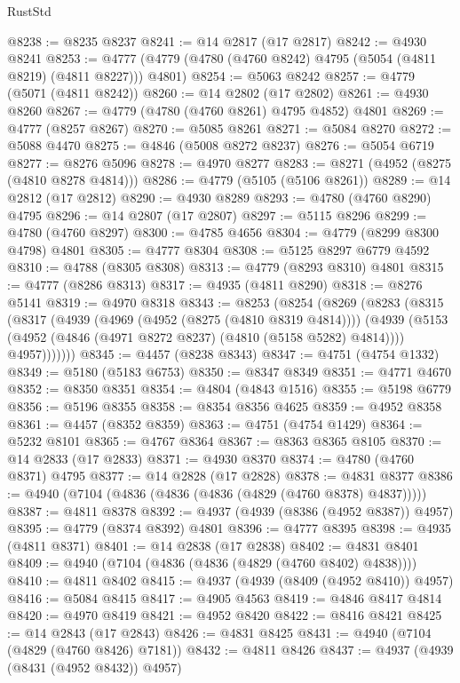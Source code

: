 \begin{lexlean}{RustStd}
\begin{coremodule}
@8238 := @8235 @8237
@8241 := @14 @2817 (@17 @2817)
@8242 := @4930 @8241
@8253 := @4777 (@4779 (@4780 (@4760 @8242) @4795 (@5054 (@4811 @8219) (@4811 @8227))) @4801)
@8254 := @5063 @8242
@8257 := @4779 (@5071 (@4811 @8242))
@8260 := @14 @2802 (@17 @2802)
@8261 := @4930 @8260
@8267 := @4779 (@4780 (@4760 @8261) @4795 @4852) @4801
@8269 := @4777 (@8257 @8267)
@8270 := @5085 @8261
@8271 := @5084 @8270
@8272 := @5088 @4470
@8275 := @4846 (@5008 @8272 @8237)
@8276 := @5054 @6719
@8277 := @8276 @5096
@8278 := @4970 @8277
@8283 := @8271 (@4952 (@8275 (@4810 @8278 @4814)))
@8286 := @4779 (@5105 (@5106 @8261))
@8289 := @14 @2812 (@17 @2812)
@8290 := @4930 @8289
@8293 := @4780 (@4760 @8290) @4795
@8296 := @14 @2807 (@17 @2807)
@8297 := @5115 @8296
@8299 := @4780 (@4760 @8297)
@8300 := @4785 @4656
@8304 := @4779 (@8299 @8300 @4798) @4801
@8305 := @4777 @8304
@8308 := @5125 @8297 @6779 @4592
@8310 := @4788 (@8305 @8308)
@8313 := @4779 (@8293 @8310) @4801
@8315 := @4777 (@8286 @8313)
@8317 := @4935 (@4811 @8290)
@8318 := @8276 @5141
@8319 := @4970 @8318
@8343 := @8253
    (@8254
      (@8269
        (@8283
          (@8315
            (@8317
              (@4939
                (@4969 (@4952 (@8275 (@4810 @8319 @4814))))
                (@4939
                  (@5153 (@4952 (@4846 (@4971 @8272 @8237) (@4810 (@5158 @5282) @4814))))
                  @4957)))))))
@8345 := @4457 (@8238 @8343)
@8347 := @4751 (@4754 @1332)
@8349 := @5180 (@5183 @6753)
@8350 := @8347 @8349
@8351 := @4771 @4670
@8352 := @8350 @8351
@8354 := @4804 (@4843 @1516)
@8355 := @5198 @6779
@8356 := @5196 @8355
@8358 := @8354 @8356 @4625
@8359 := @4952 @8358
@8361 := @4457 (@8352 @8359)
@8363 := @4751 (@4754 @1429)
@8364 := @5232 @8101
@8365 := @4767 @8364
@8367 := @8363 @8365 @8105
@8370 := @14 @2833 (@17 @2833)
@8371 := @4930 @8370
@8374 := @4780 (@4760 @8371) @4795
@8377 := @14 @2828 (@17 @2828)
@8378 := @4831 @8377
@8386 := @4940 (@7104 (@4836 (@4836 (@4836 (@4829 (@4760 @8378) @4837)))))
@8387 := @4811 @8378
@8392 := @4937 (@4939 (@8386 (@4952 @8387)) @4957)
@8395 := @4779 (@8374 @8392) @4801
@8396 := @4777 @8395
@8398 := @4935 (@4811 @8371)
@8401 := @14 @2838 (@17 @2838)
@8402 := @4831 @8401
@8409 := @4940 (@7104 (@4836 (@4836 (@4829 (@4760 @8402) @4838))))
@8410 := @4811 @8402
@8415 := @4937 (@4939 (@8409 (@4952 @8410)) @4957)
@8416 := @5084 @8415
@8417 := @4905 @4563
@8419 := @4846 @8417 @4814
@8420 := @4970 @8419
@8421 := @4952 @8420
@8422 := @8416 @8421
@8425 := @14 @2843 (@17 @2843)
@8426 := @4831 @8425
@8431 := @4940 (@7104 (@4829 (@4760 @8426) @7181))
@8432 := @4811 @8426
@8437 := @4937 (@4939 (@8431 (@4952 @8432)) @4957)

\end{coremodule}
\end{lexlean}
